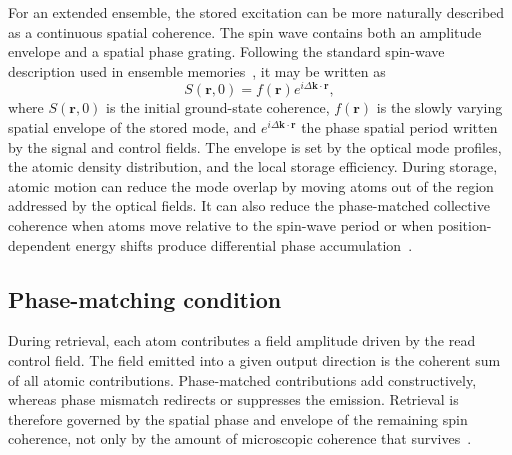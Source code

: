 For an extended ensemble, the stored excitation can be more naturally described as a continuous spatial coherence. The spin wave contains both an amplitude envelope and a spatial phase grating. Following the standard spin-wave description used in ensemble memories~\cite{PsiL-odamIFm_GorshkovEtAl_2007, QmfpDp_FleischhauerEtAl_2002}, it may be written as
\begin{equation}
    S(\mathbf{r},0)
    =
    f(\mathbf{r})
    e^{i\Delta\mathbf{k}\cdot\mathbf{r}},
    \label{eq:continuous_spin_wave_initial}
\end{equation}
where $S(\mathbf{r},0)$ is the initial ground-state coherence, $f(\mathbf{r})$ is the slowly varying spatial envelope of the stored mode, and $e^{i\Delta\mathbf{k}\cdot\mathbf{r}}$ the phase spatial period written by the signal and control fields. The envelope is set by the optical mode profiles, the atomic density distribution, and the local storage efficiency. During storage, atomic motion can reduce the mode overlap by moving atoms out of the region addressed by the optical fields. It can also reduce the phase-matched collective coherence when atoms move relative to the spin-wave period or when position-dependent energy shifts produce differential phase accumulation~\cite{PsiL-odamIFm_GorshkovEtAl_2007, QmfpDp_FleischhauerEtAl_2002}.
\subsection{Phase-matching condition}
During retrieval, each atom contributes a field amplitude driven by the read control field. The field emitted into a given output direction is the coherent sum of all atomic contributions. Phase-matched contributions add constructively, whereas phase mismatch redirects or suppresses the emission. Retrieval is therefore governed by the spatial phase and envelope of the remaining spin coherence, not only by the amount of microscopic coherence that survives~\cite{PsiL-odamIFm_GorshkovEtAl_2007}.

